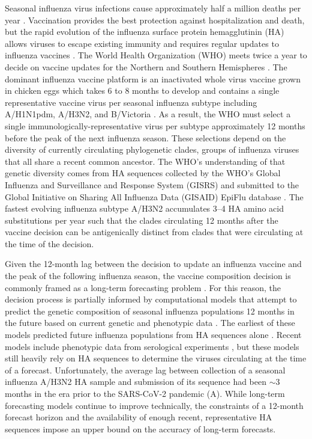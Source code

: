 \documentclass[9pt,lineno]{elife}
\begin{document}
Seasonal influenza virus infections cause approximately half a million deaths per year \citep{flufactsheet}.
Vaccination provides the best protection against hospitalization and death, but the rapid evolution of the influenza surface protein hemagglutinin (HA) allows viruses to escape existing immunity and requires regular updates to influenza vaccines \citep{Petrova2018}.
The World Health Organization (WHO) meets twice a year to decide on vaccine updates for the Northern and Southern Hemispheres \citep{Morris2018}.
The dominant influenza vaccine platform is an inactivated whole virus vaccine grown in chicken eggs \citep{Wong2013} which takes 6 to 8 months to develop and contains a single representative vaccine virus per seasonal influenza subtype including A/H1N1pdm, A/H3N2, and B/Victoria \citep{Morris2018}.
As a result, the WHO must select a single immunologically-representative virus per subtype approximately 12 months before the peak of the next influenza season.
These selections depend on the diversity of currently circulating phylogenetic clades, groups of influenza viruses that all share a recent common ancestor.
The WHO's understanding of that genetic diversity comes from HA sequences collected by the WHO's Global Influenza and Surveillance and Response System (GISRS) \citep{Hay2018} and submitted to the Global Initiative on Sharing All Influenza Data (GISAID) EpiFlu database \citep{gisaid}.
The fastest evolving influenza subtype A/H3N2 accumulates 3--4 HA amino acid substitutions per year \citep{Smith2004,Kistler2023} such that the clades circulating 12 months after the vaccine decision can be antigenically distinct from clades that were circulating at the time of the decision.

Given the 12-month lag between the decision to update an influenza vaccine and the peak of the following influenza season, the vaccine composition decision is commonly framed as a long-term forecasting problem \citep{Lassig2017}.
For this reason, the decision process is partially informed by computational models that attempt to predict the genetic composition of seasonal influenza populations 12 months in the future based on current genetic and phenotypic data \citep{Morris2018}.
The earliest of these models predicted future influenza populations from HA sequences alone \citep{Luksza:2014hj,Neher:2014eu,Steinbruck2014}.
Recent models include phenotypic data from serological experiments \citep{Morris2018,Huddleston2020,Meijers2023,Meijers2024}, but these models still heavily rely on HA sequences to determine the viruses circulating at the time of a forecast.
Unfortunately, the average lag between collection of a seasonal influenza A/H3N2 HA sample and submission of its sequence had been $\sim$3 months in the era prior to the SARS-CoV-2 pandemic (A).
While long-term forecasting models continue to improve technically, the constraints of a 12-month forecast horizon and the availability of enough recent, representative HA sequences impose an upper bound on the accuracy of long-term forecasts.
\end{document}
